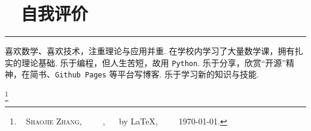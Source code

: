 \documentclass[a4paper, 11pt]{ctexart}
\newcommand\blfootnote[1]{%
	\begingroup
	\renewcommand\thefootnote{}\footnote{#1}%
	\addtocounter{footnote}{-1}%
	\endgroup
}
\begin{document}
\vspace{-1cm}

\section*{\faPaperPlane ~ 自我评价} \vspace{-0.25cm}\hrule
{\small \qquad 
喜欢数学、喜欢技术，注重理论与应用并重. 在学校内学习了大量数学课，拥有扎实的理论基础.
乐于编程，但人生苦短，故用 \texttt{Python}. 乐于分享，欣赏“开源”精神，在简书、\texttt{Github Pages} 等平台写博客. 乐于学习新的知识与技能.
}


\blfootnote{
	\color{mygray2}
	\faCopyright ~ \textsc{Shaojie Zhang}, ~~
	\faGithub ~ \href{https://github.com/Jupiter-19/resume}{\color{mygray2}{jupiter-19/resume}}, ~~ by \LaTeX, ~~
	\faCalendar ~ \today.
}
\end{document}
